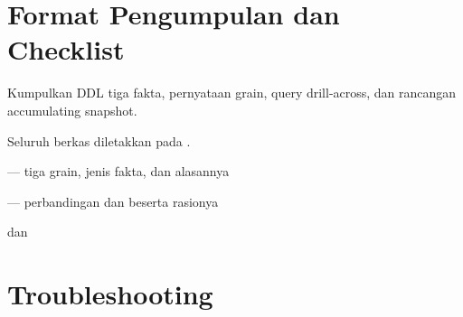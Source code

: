 \section{Format Pengumpulan dan Checklist}

Kumpulkan DDL tiga fakta, pernyataan grain, query drill-across, dan rancangan
accumulating snapshot.

Seluruh berkas diletakkan pada .

\begin{ceklis}
  \item {}
  \item {} --- tiga grain, jenis fakta, dan alasannya
  \item {}
  \item {}
  \item {} --- perbandingan  dan
         beserta rasionya
  \item {} dan 
  \item {}
  \item {}
\end{ceklis}

\section{Troubleshooting}

